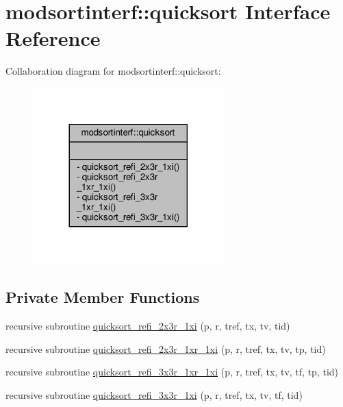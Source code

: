 \hypertarget{interfacemodsortinterf_1_1quicksort}{}\section{modsortinterf\+:\+:quicksort Interface Reference}
\label{interfacemodsortinterf_1_1quicksort}


Collaboration diagram for modsortinterf\+:\+:quicksort\+:\nopagebreak
\begin{figure}[H]
\begin{center}
\leavevmode
\includegraphics[width=209pt]{interfacemodsortinterf_1_1quicksort__coll__graph}
\end{center}
\end{figure}
\subsection*{Private Member Functions}
\begin{DoxyCompactItemize}
\item 
recursive subroutine \hyperlink{interfacemodsortinterf_1_1quicksort_a88e479f171ee05e6abb21a575e1adeba}{quicksort\+\_\+refi\+\_\+2x3r\+\_\+1xi} (p, r, tref, tx, tv, tid)
\item 
recursive subroutine \hyperlink{interfacemodsortinterf_1_1quicksort_a7fbea10343fd99b63db7567ea5144ede}{quicksort\+\_\+refi\+\_\+2x3r\+\_\+1xr\+\_\+1xi} (p, r, tref, tx, tv, tp, tid)
\item 
recursive subroutine \hyperlink{interfacemodsortinterf_1_1quicksort_a237ac7aee8dc5e42d744ff43931172c7}{quicksort\+\_\+refi\+\_\+3x3r\+\_\+1xr\+\_\+1xi} (p, r, tref, tx, tv, tf, tp, tid)
\item 
recursive subroutine \hyperlink{interfacemodsortinterf_1_1quicksort_aec3f4280d2579e6d98acd38398728d28}{quicksort\+\_\+refi\+\_\+3x3r\+\_\+1xi} (p, r, tref, tx, tv, tf, tid)
\end{DoxyCompactItemize}


